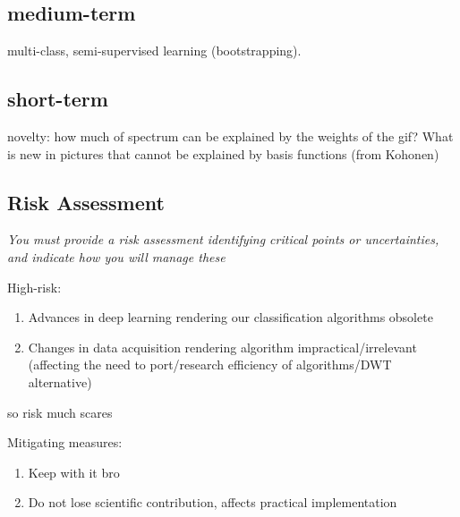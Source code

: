 \documentclass[12pt]{llncs}
\begin{document}
\subsection{medium-term} multi-class, semi-supervised learning (bootstrapping).
\subsection{short-term} novelty: how much of spectrum can be explained by the weights of the gif? What is new in pictures that cannot be explained by basis functions (from Kohonen)


\subsection{Risk Assessment}
\emph{You must provide a risk assessment identifying critical points or uncertainties, and indicate how you will manage these}

High-risk: 
\begin{enumerate} 
\item Advances in deep learning rendering our classification algorithms obsolete
\item Changes in data acquisition rendering algorithm impractical/irrelevant (affecting the need to port/research efficiency of algorithms/DWT alternative)

\end{enumerate}

so risk much scares

Mitigating measures:
\begin{enumerate}
	\item Keep with it bro
	\item Do not lose scientific contribution, affects practical implementation
\end{enumerate}
%
%




\end{document}
